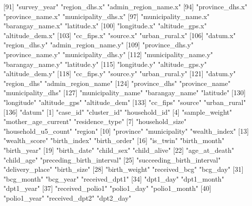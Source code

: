  [91] "survey_year"               "region_dhs.x"              "admin_region_name.x"      
 [94] "province_dhs.x"            "province_name.x"           "municipality_dhs.x"       
 [97] "municipality_name.x"       "barangay_name.x"           "latitude.x"               
[100] "longitude.x"               "altitude_gps.x"            "altitude_dem.x"           
[103] "cc_fips.x"                 "source.x"                  "urban_rural.x"            
[106] "datum.x"                   "region_dhs.y"              "admin_region_name.y"      
[109] "province_dhs.y"            "province_name.y"           "municipality_dhs.y"       
[112] "municipality_name.y"       "barangay_name.y"           "latitude.y"               
[115] "longitude.y"               "altitude_gps.y"            "altitude_dem.y"           
[118] "cc_fips.y"                 "source.y"                  "urban_rural.y"            
[121] "datum.y"                   "region_dhs"                "admin_region_name"        
[124] "province_dhs"              "province_name"             "municipality_dhs"         
[127] "municipality_name"         "barangay_name"             "latitude"                 
[130] "longitude"                 "altitude_gps"              "altitude_dem"             
[133] "cc_fips"                   "source"                    "urban_rural"              
[136] "datum"                    
  [1] "case_id"                   "cluster_id"                "household_id"             
  [4] "sample_weight"             "mother_age_current"        "residence_type"           
  [7] "household_size"            "household_u5_count"        "region"                   
 [10] "province"                  "municipality"              "wealth_index"             
 [13] "wealth_score"              "birth_index"               "birth_order"              
 [16] "is_twin"                   "birth_month"               "birth_year"               
 [19] "birth_date"                "child_sex"                 "child_alive"              
 [22] "age_at_death"              "child_age"                 "preceding_birth_interval" 
 [25] "succeeding_birth_interval" "delivery_place"            "birth_size"               
 [28] "birth_weight"              "received_bcg"              "bcg_day"                  
 [31] "bcg_month"                 "bcg_year"                  "received_dpt1"            
 [34] "dpt1_day"                  "dpt1_month"                "dpt1_year"                
 [37] "received_polio1"           "polio1_day"                "polio1_month"             
 [40] "polio1_year"               "received_dpt2"             "dpt2_day"                 
